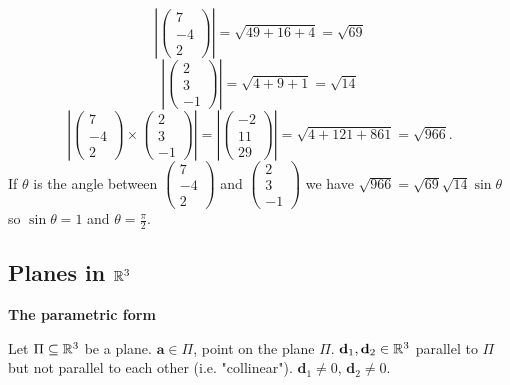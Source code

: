 \documentclass[10pt, a4paper]{article}
\newcommand{\mbf}[1]{\mathbf{#1}}
\begin{document}
\begin{example}
    \[
    \left|\begin{pmatrix}
        7 \\ -4 \\ 2   
    \end{pmatrix}\right| = \sqrt{49 + 16 + 4} = \sqrt{69}
    \]
    \[
    \left|\begin{pmatrix}
        2 \\ 3 \\ -1
    \end{pmatrix}\right| = \sqrt{4 + 9 + 1} = \sqrt{14}
    \]
    \[
    \left|\begin{pmatrix}
        7 \\ -4 \\ 2   
    \end{pmatrix}
    \times
    \begin{pmatrix}
        2 \\ 3 \\ -1
    \end{pmatrix}\right| = \left|\begin{pmatrix}
        -2 \\ 11 \\ 29
    \end{pmatrix}\right| = \sqrt{4 + 121 + 861} = \sqrt{966}.
    \]
    If $\theta$ is the angle between $\begin{pmatrix}
        7 \\ -4 \\ 2   
    \end{pmatrix}$ and $\begin{pmatrix}
        2 \\ 3 \\ -1
    \end{pmatrix}$ we have $\sqrt{966} = \sqrt{69}\sqrt{14}\sin\theta$ so $\sin\theta = 1$ and $\theta = \frac{\pi}{2}$.
\end{example}

\subsection{Planes in \texorpdfstring{$\mathbb{R} ^ 3$}{}}

\textbf{The parametric form}

Let $\Pi \subseteq \mathbb{R} ^ 3$ be a plane. $\mbf{a} \in \Pi$, point on the plane $\Pi$. $\mbf{d}_1, \mbf{d}_2 \in \R ^ 3$ parallel to $\Pi$ but not parallel to each other (i.e. "collinear"). $\mbf{d}_1 \neq 0$, $\mbf{d}_2 \neq 0$.
\end{document}
